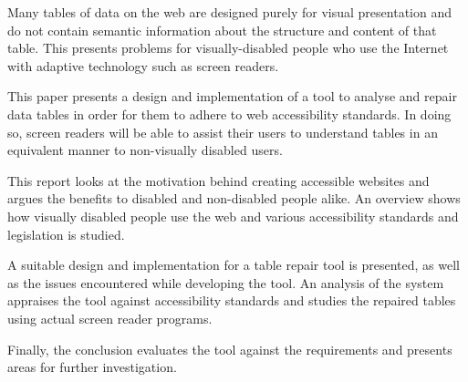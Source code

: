 \begin{abstract2}

Many tables of data on the web are designed purely for visual presentation
and do not contain semantic information about the structure and content of
that table. This presents problems for visually-disabled people who use the
Internet with adaptive technology such as screen readers.

This paper presents a design and implementation of a tool to analyse and repair
data tables in order for them to adhere to web accessibility standards. In
doing so, screen readers will be able to assist their users to understand
tables in an equivalent manner to non-visually disabled users.

This report looks at the motivation behind creating accessible websites and 
argues the benefits to disabled and non-disabled people alike. An overview
shows how visually disabled people use the web and various accessibility 
standards and legislation is studied.

A suitable design and implementation for a table repair tool is presented, as
well as the issues encountered while developing the tool. An analysis of the
system appraises the tool against accessibility standards and studies
the repaired tables using actual screen reader programs.

Finally, the conclusion evaluates the tool against the requirements and 
presents areas for further investigation.

\end{abstract2}
